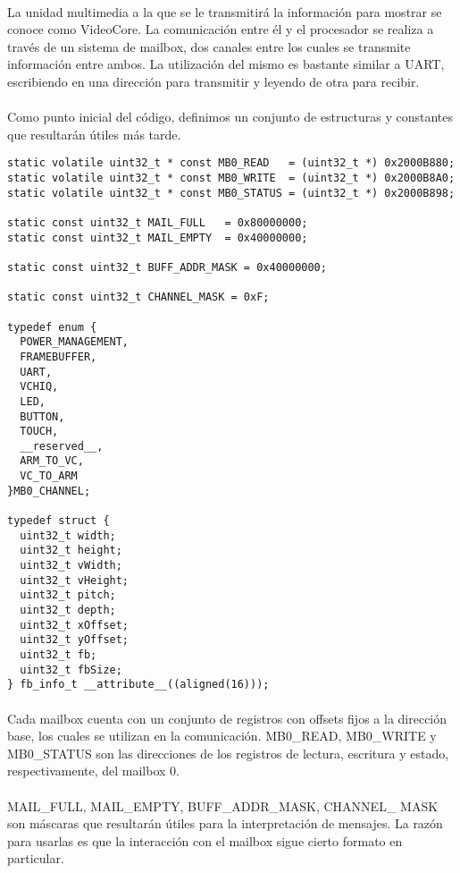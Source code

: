 \documentclass{article}
\begin{document}
\paragraph{}
La unidad multimedia a la que se le transmitir\'a la informaci\'on para mostrar se conoce como VideoCore. La comunicaci\'on entre \'el y el procesador se realiza a trav\'es de un sistema de mailbox, dos canales entre los cuales se transmite informaci\'on entre ambos. La utilizaci\'on del mismo es bastante similar a UART, escribiendo en una direcci\'on para transmitir y leyendo de otra para recibir. 

\paragraph{}
Como punto inicial del c\'odigo, definimos un conjunto de estructuras y constantes que resultar\'an \'utiles m\'as tarde.

\begin{lstlisting}
static volatile uint32_t * const MB0_READ   = (uint32_t *) 0x2000B880;
static volatile uint32_t * const MB0_WRITE  = (uint32_t *) 0x2000B8A0;
static volatile uint32_t * const MB0_STATUS = (uint32_t *) 0x2000B898;

static const uint32_t MAIL_FULL   = 0x80000000;
static const uint32_t MAIL_EMPTY  = 0x40000000;

static const uint32_t BUFF_ADDR_MASK = 0x40000000; 

static const uint32_t CHANNEL_MASK = 0xF;

typedef enum {
  POWER_MANAGEMENT,
  FRAMEBUFFER,
  UART,
  VCHIQ,
  LED,
  BUTTON,
  TOUCH,
  __reserved__,
  ARM_TO_VC,
  VC_TO_ARM
}MB0_CHANNEL;

typedef struct {
  uint32_t width;
  uint32_t height;
  uint32_t vWidth;
  uint32_t vHeight;
  uint32_t pitch;
  uint32_t depth;
  uint32_t xOffset;
  uint32_t yOffset;
  uint32_t fb;
  uint32_t fbSize; 
} fb_info_t __attribute__((aligned(16)));
\end{lstlisting}

\paragraph{}
Cada mailbox cuenta con un conjunto de registros con offsets fijos a la direcci\'on base, los cuales se utilizan en la comunicaci\'on. MB0\_READ, MB0\_WRITE y MB0\_STATUS son las direcciones de los registros de lectura, escritura y estado, respectivamente, del mailbox 0.

\paragraph{}
MAIL\_FULL, MAIL\_EMPTY, BUFF\_ADDR\_MASK, CHANNEL\_ MASK son m\'ascaras que resultar\'an \'utiles para la interpretaci\'on de mensajes. La raz\'on para usarlas es que la interacci\'on con el mailbox sigue cierto formato en particular.
\end{document}
